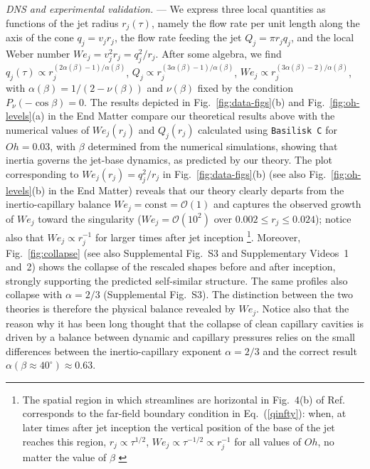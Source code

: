 \documentclass[aps,prl,reprint,floatfix]{revtex4-2}
\begin{document}
\emph{DNS and experimental validation.} --- We express three local quantities as functions of the jet radius $r_j(\tau)$, namely the flow rate per unit length along the axis of the cone $q_j=v_j r_j$, the flow rate feeding the jet $Q_j=\pi r_j q_j$, and the local Weber number $We_j=v^2_j r_j=q^2_j/r_j$. After some algebra, we find $q_j(\tau)\propto r_j^{(2\alpha(\beta)-1)/\alpha(\beta)}$, $Q_j\propto r_j^{(3\alpha(\beta)-1)/\alpha(\beta)}$, $We_j\propto r_j^{(3\alpha(\beta)-2)/\alpha(\beta)}$, with $\alpha(\beta)=1/(2-\nu(\beta))$ and $\nu(\beta)$ fixed by the condition $P_\nu(-\cos\beta)=0$. The results depicted in Fig.~\ref{fig:data-figs}(b) and Fig.~\ref{fig:oh-levels}(a) in the End Matter compare our theoretical results above with the numerical values of $We_j(r_j)$ and $Q_j(r_j)$ calculated using \texttt{Basilisk C} \cite{Popinet2009,Popinet2015,Vatsal2021} for $Oh=0.03$, with $\beta$ determined from the numerical simulations, showing that inertia governs the jet-base dynamics, as predicted by our theory. The plot corresponding to $We_j(r_j)=q^2_j/r_j$ in Fig.~\ref{fig:data-figs}(b) (see also Fig.~\ref{fig:oh-levels}(b) in the End Matter) reveals that our theory clearly departs from the inertio-capillary balance $We_j=\mathrm{const}=\mathcal{O}(1)$ and captures the observed growth of $We_j$ toward the singularity ($We_j=\mathcal{O}(10^2)$ over $0.002\le r_j\le0.024$); notice also that $We_j\propto r^{-1}_j$ for larger times after jet inception \footnote{The spatial region in which streamlines are horizontal in Fig.~4(b) of Ref.~\cite{PRF2023} corresponds to the far-field boundary condition in Eq.~(\ref{qinfty}): when, at later times after jet inception the vertical position of the base of the jet reaches this region, $r_j\propto \tau^{1/2}$, $We_j\propto \tau^{-1/2}\propto r^{-1}_j$ for all values of $Oh$, no matter the value of $\beta$ \cite{PRF2023}}.
Moreover, Fig.~\ref{fig:collapse} (see also Supplemental Fig.~S3 and Supplementary Videos~1 and~2) shows the collapse of the rescaled shapes before and after inception, strongly supporting the predicted self-similar structure. The same profiles also collapse with $\alpha=2/3$ (Supplemental Fig.~S3). The distinction between the two theories is therefore the physical balance revealed by $We_j$. Notice also that the reason why it has been long thought \cite{Zeff,PRLEggers,PRLCattaneo} that the collapse of clean capillary cavities is driven by a balance between dynamic and capillary pressures relies on the small differences between the inertio-capillary exponent $\alpha=2/3$ and the correct result $\alpha(\beta\approx 40^\circ)\approx0.63$.
\end{document}
